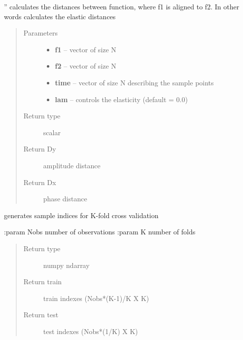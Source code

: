 \documentclass[letterpaper,10pt,english]{sphinxmanual}
\begin{document}
\begin{fulllineitems}
\label{utility_functions:utility_functions.elastic_distance}
''
calculates the distances between function, where f1 is aligned to f2. In other words
calculates the elastic distances
\begin{quote}\begin{description}
\item[{Parameters}] \leavevmode\begin{itemize}
\item {} 
\textbf{f1} -- vector of size N

\item {} 
\textbf{f2} -- vector of size N

\item {} 
\textbf{time} -- vector of size N describing the sample points

\item {} 
\textbf{lam} -- controls the elasticity (default = 0.0)

\end{itemize}

\item[{Return type}] \leavevmode
scalar

\item[{Return Dy}] \leavevmode
amplitude distance

\item[{Return Dx}] \leavevmode
phase distance

\end{description}\end{quote}

\end{fulllineitems}


\begin{fulllineitems}
\label{utility_functions:utility_functions.f_K_fold}
generates sample indices for K-fold cross validation

:param Nobs number of observations
:param K number of folds
\begin{quote}\begin{description}
\item[{Return type}] \leavevmode
numpy ndarray

\item[{Return train}] \leavevmode
train indexes (Nobs*(K-1)/K X K)

\item[{Return test}] \leavevmode
test indexes (Nobs*(1/K) X K)

\end{description}\end{quote}

\end{fulllineitems}
\end{document}

